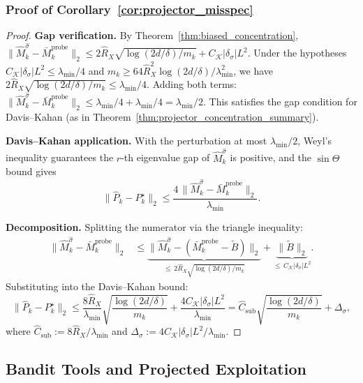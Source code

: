 \documentclass{article}
\begin{document}
\subsubsection{Proof of Corollary~\ref{cor:projector_misspec}}
\label{proof:projector_misspec}

\begin{proof}
\textbf{Gap verification.}
By Theorem~\ref{thm:biased_concentration}, $\|\widehat M_k^{\hat\sigma} - \bar M_k^{\mathrm{probe}}\|_2 \le 2\hat R_X\sqrt{\log(2d/\delta)/m_k} + C_{\mathcal K}|\delta_\sigma|L^2$.  Under the hypotheses $C_{\mathcal K}|\delta_\sigma|L^2 \le \lambda_{\min}/4$ and $m_k \ge 64\hat R_X^2\log(2d/\delta)/\lambda_{\min}^2$, we have $2\hat R_X\sqrt{\log(2d/\delta)/m_k} \le \lambda_{\min}/4$.  Adding both terms: $\|\widehat M_k^{\hat\sigma} - \bar M_k^{\mathrm{probe}}\|_2 \le \lambda_{\min}/4 + \lambda_{\min}/4 = \lambda_{\min}/2$.
This satisfies the gap condition for Davis--Kahan (as in Theorem~\ref{thm:projector_concentration_summary}).

\textbf{Davis--Kahan application.}
With the perturbation at most $\lambda_{\min}/2$, Weyl's inequality guarantees the $r$-th eigenvalue gap of $\widehat M_k^{\hat\sigma}$ is positive, and the $\sin\Theta$ bound gives
\[
\|\widehat P_k - P_k^\star\|_2 \le \frac{4\,\|\widehat M_k^{\hat\sigma} - \bar M_k^{\mathrm{probe}}\|_2}{\lambda_{\min}}.
\]

\textbf{Decomposition.}
Splitting the numerator via the triangle inequality:
\begin{align*}
\|\widehat M_k^{\hat\sigma} - \bar M_k^{\mathrm{probe}}\|_2
&\le \underbrace{\|\widehat M_k^{\hat\sigma} - (\bar M_k^{\mathrm{probe}} - \widetilde B)\|_2}_{\le\, 2\hat R_X\sqrt{\log(2d/\delta)/m_k}} + \underbrace{\|\widetilde B\|_2}_{\le\, C_{\mathcal K}|\delta_\sigma|L^2}.
\end{align*}
Substituting into the Davis--Kahan bound:
\[
\|\widehat P_k - P_k^\star\|_2
\le \frac{8\hat R_X}{\lambda_{\min}}\sqrt{\frac{\log(2d/\delta)}{m_k}} + \frac{4C_{\mathcal K}|\delta_\sigma|L^2}{\lambda_{\min}}
= \hat C_{\mathrm{sub}}\sqrt{\frac{\log(2d/\delta)}{m_k}} + \Delta_\sigma,
\]
where $\hat C_{\mathrm{sub}} := 8\hat R_X/\lambda_{\min}$ and $\Delta_\sigma := 4C_{\mathcal K}|\delta_\sigma|L^2/\lambda_{\min}$.
\end{proof}

\subsection{Bandit Tools and Projected Exploitation}
\end{document}
